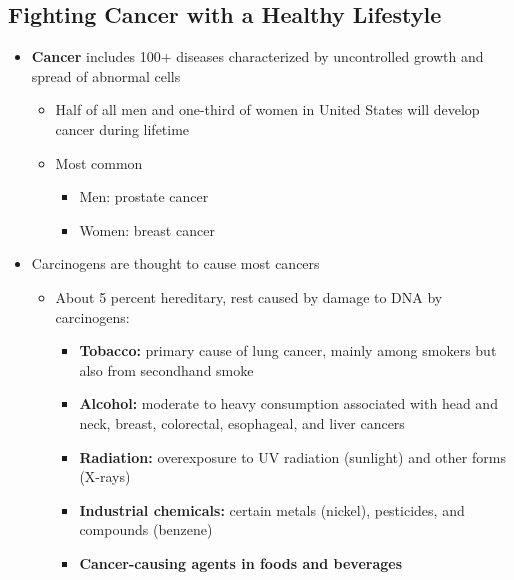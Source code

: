 \documentclass[12pt]{article}
\begin{document}
        \subsection{Fighting Cancer with a Healthy Lifestyle}
            \begin{itemize}
                \item \textbf{Cancer} includes 100+ diseases characterized by uncontrolled growth and spread of abnormal cells
                    \begin{itemize}
                        \item Half of all men and one-third of women in United States will develop cancer during lifetime
                        \item Most common
                            \begin{itemize}
                                \item Men: prostate cancer
                                \item Women: breast cancer
                            \end{itemize}
                    \end{itemize}
                \item Carcinogens are thought to cause most cancers
                    \begin{itemize}
                        \item About 5 percent hereditary, rest caused by damage to DNA by carcinogens:
                            \begin{itemize}
                                \item \textbf{Tobacco:} primary cause of lung cancer, mainly among smokers but also from secondhand smoke
                                \item \textbf{Alcohol:} moderate to heavy consumption associated with head and neck, breast, colorectal, esophageal, and liver cancers
                                \item \textbf{Radiation:} overexposure to UV radiation (sunlight) and other forms (X-rays)
                                \item \textbf{Industrial chemicals:} certain metals (nickel), pesticides, and compounds (benzene)
                                \item \textbf{Cancer-causing agents in foods and beverages}
                            \end{itemize}
                    \end{itemize}

\end{itemize}
\end{document}
